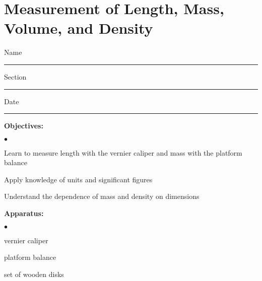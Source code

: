 
\section{Measurement of Length, Mass, Volume, and Density}

Name \rule{2.0in}{0.1pt}\hfill{}Section \rule{1.0in}{0.1pt}\hfill{}Date \rule{1.0in}{0.1pt}

{\noindent \bf Objectives:} \begin{list}{$\bullet$}{\itemsep0pt }

\item Learn to measure length with the vernier caliper and mass with the platform balance \item Apply knowledge of units and significant figures \item Understand the dependence of mass and density on dimensions

\end{list}

{\noindent \bf Apparatus:} \begin{list}{$\bullet$}{\itemsep0pt }

\item vernier caliper \item platform balance \item set of wooden disks

\end{list}

